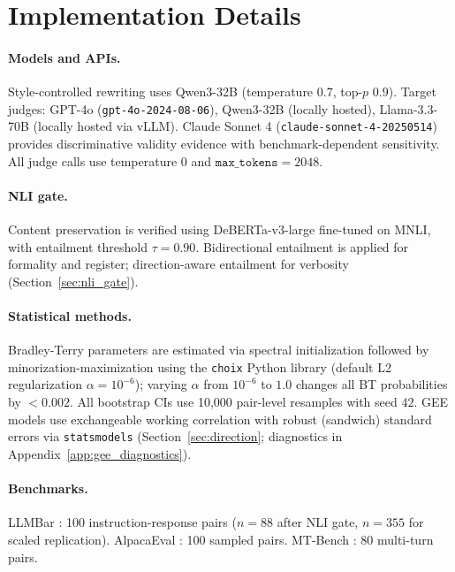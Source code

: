 \section{Implementation Details}
\label{app:implementation}

\paragraph{Models and APIs.}
Style-controlled rewriting uses Qwen3-32B (temperature $0.7$, top-$p$ $0.9$).
Target judges: GPT-4o (\texttt{gpt-4o-2024-08-06}), Qwen3-32B (locally hosted), Llama-3.3-70B (locally hosted via vLLM).
Claude Sonnet 4 (\texttt{claude-sonnet-4-20250514}) provides discriminative validity evidence with benchmark-dependent sensitivity.
All judge calls use temperature $0$ and $\texttt{max\_tokens} = 2048$.

\paragraph{NLI gate.}
Content preservation is verified using DeBERTa-v3-large \citep{he2021debertav3} fine-tuned on MNLI, with entailment threshold $\tau = 0.90$.
Bidirectional entailment is applied for formality and register; direction-aware entailment for verbosity (Section~\ref{sec:nli_gate}).

\paragraph{Statistical methods.}
Bradley-Terry parameters are estimated via spectral initialization followed by minorization-maximization \citep{hunter2004mm} using the \texttt{choix} Python library (default L2 regularization $\alpha = 10^{-6}$); varying $\alpha$ from $10^{-6}$ to $1.0$ changes all BT probabilities by ${<}0.002$.
All bootstrap CIs use 10{,}000 pair-level resamples with seed $42$.
GEE models use exchangeable working correlation with robust (sandwich) standard errors via \texttt{statsmodels} (Section~\ref{sec:direction}; diagnostics in Appendix~\ref{app:gee_diagnostics}).

\paragraph{Benchmarks.}
LLMBar \citep{zeng2023llmbar}: 100 instruction-response pairs ($n = 88$ after NLI gate, $n = 355$ for scaled replication).
AlpacaEval \citep{dubois2025lc}: 100 sampled pairs.
MT-Bench \citep{zheng2023judging}: 80 multi-turn pairs.


